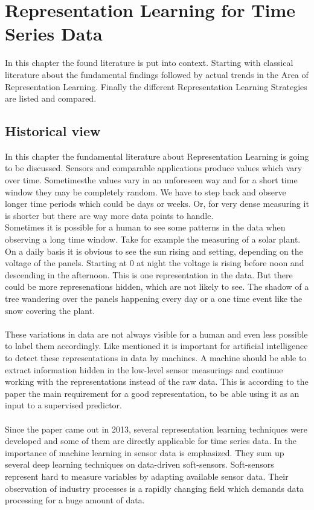 \section{Representation Learning for Time Series Data}\label{review}
In this chapter the found literature is put into context. Starting with classical literature about the fundamental findings followed by actual trends in the Area of Representation Learning. Finally the different Representation Learning Strategies are listed and compared.
\subsection{Historical view}
In this chapter the fundamental literature about Representation Learning is going to be discussed.
Sensors and comparable applications produce values which vary over time. Sometimesthe values vary in an unforeseen way and for a short time window they may be completely random. We have to step back and observe longer time periods which could be days or weeks. Or, for very dense measuring it is shorter but there are way more data points to handle.\\%
Sometimes it is possible for a human to see some patterns in the data when observing a long time window. Take for example the measuring of a solar plant. On a daily basis it is obvious to see the sun rising and setting, depending on the voltage of the panels. Starting at 0 at night the voltage is rising before noon and descending in the afternoon. This is one representation in the data. But there could be more represenations hidden, which are not likely to see. The shadow of a tree wandering over the panels happening every day or a one time event like the snow covering the plant. \\\\
These variations in data are not always visible for a human and even less possible to label them accordingly. Like \cite{bengio_representation_2013} mentioned it is important for artificial intelligence to detect these representations in data by machines. A machine should be able to extract information hidden in the low-level sensor measurings and continue working with the representations instead of the raw data. This is according to the paper the main requirement for a good representation, to be able using it as an input to a supervised predictor.\\\\
Since the paper came out in 2013, several representation learning techniques were developed and some of them are directly applicable for time series data. In \cite{sun_survey_2021} the importance of machine learning in sensor data is emphasized. They sum up several deep learning techniques on data-driven soft-sensors. Soft-sensors represent hard to measure variables by adapting available sensor data. Their observation of industry processes is a rapidly changing field which demands data processing for a huge amount of data.
